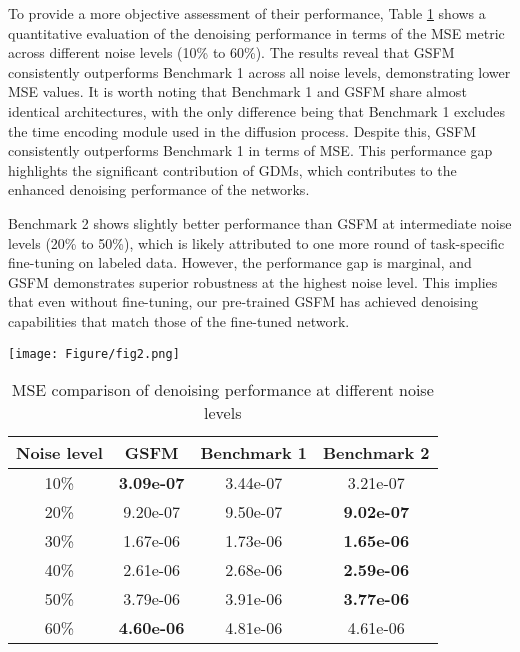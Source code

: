 To provide a more objective assessment of their performance, Table \ref{tab2} shows a quantitative evaluation of the denoising performance in terms of the MSE metric across different noise levels (10\% to 60\%). The results reveal that GSFM consistently outperforms Benchmark 1 across all noise levels, demonstrating lower MSE values. It is worth noting that Benchmark 1 and GSFM share almost identical architectures, with the only difference being that Benchmark 1 excludes the time encoding module used in the diffusion process. Despite this, GSFM consistently outperforms Benchmark 1 in terms of MSE. This performance gap highlights the significant contribution of GDMs, which contributes to the enhanced denoising performance of the networks. 

Benchmark 2 shows slightly better performance than GSFM at intermediate noise levels (20\% to 50\%), which is likely attributed to one more round of task-specific fine-tuning on labeled data. However, the performance gap is marginal, and GSFM demonstrates superior robustness at the highest noise level. This implies that even without fine-tuning, our pre-trained GSFM has achieved denoising capabilities that match those of the fine-tuned network.


\begin{figure*}[htbp]
\centering
\texttt{[image: Figure/fig2.png]}
\caption{Denoising performance comparison between our pre-trained DSFM and two benchmarks on synthetic data. (a) The clean and (b) noisy data, where the noisy data is created by injecting random noise with a level of 30\% into the clean data. The denoised products from (c) our GSFM, (d) Benchmark 1, and (e) Benchmark 2. f, g, and h are the corresponding difference between the denoised results and the clean data. }
\label{fig2}
\end{figure*}


\begin{table}[htbp]
    \centering
    \caption{MSE comparison of denoising performance at different noise levels}
    \begin{tabular}{cccc}
        \toprule
        Noise level & GSFM & Benchmark 1 & Benchmark 2 \\
        \midrule
        10\% &   \textbf{3.09e-07} & 3.44e-07 & 3.21e-07 \\
        20\% &  9.20e-07 & 9.50e-07 & \textbf{9.02e-07} \\
        30\% &  1.67e-06 & 1.73e-06 & \textbf{1.65e-06} \\
        40\% &  2.61e-06 & 2.68e-06 & \textbf{2.59e-06} \\
        50\% &  3.79e-06 & 3.91e-06 & \textbf{3.77e-06} \\
        60\% &  \textbf{4.60e-06} & 4.81e-06 & 4.61e-06 \\
        \bottomrule
    \end{tabular}
    \label{tab2}
\end{table}


